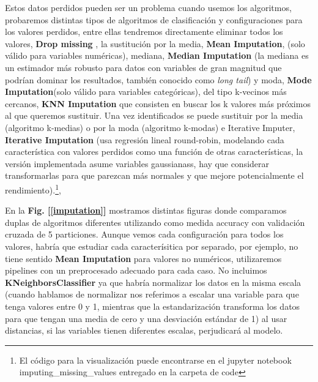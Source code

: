 \documentclass[12pt,twoside]{report}
\begin{document}
Estos datos perdidos pueden ser un problema cuando usemos los algoritmos, probaremos distintas tipos de algoritmos de clasificación y configuraciones para los valores perdidos, entre ellas tendremos directamente eliminar todos los valores, \textbf{Drop missing} , la sustitución por la media, \textbf{Mean Imputation}, (solo válido para variables numéricas), mediana, \textbf{Median Imputation} (la mediana es un estimador más robusto para datos con variables de gran magnitud que podrían dominar los resultados, también conocido como \textit{long tail}) y moda, \textbf{Mode Imputation}(solo válido para variables categóricas), del tipo k-vecinos más cercanos, \textbf{KNN Imputation} que consisten en buscar los k valores más próximos al que queremos sustituir. Una vez identificados se puede sustituir por la media (algoritmo k-medias) o por la moda (algoritmo k-modas) e Iterative Imputer, \textbf{Iterative Imputation} (usa regresión lineal round-robin, modelando cada característica con valores perdidos como una función de otras características, la versión implementada asume variables gaussianass, hay que considerar transformarlas para que parezcan más normales y que mejore potencialmente el rendimiento).\footnote{El código para la visualización puede encontrarse en el jupyter notebook imputing\_missing\_values entregado en la carpeta de code},



En la \textbf{Fig. [\ref{imputation}]} mostramos distintas figuras donde comparamos duplas de algoritmos diferentes utilizando como medida accuracy con validación cruzada de 5 particiones. Aunque vemos cada configuración para todos los valores, habría que estudiar cada caracterísitica por separado, por ejemplo, no tiene sentido \textbf{Mean Imputation} para valores no numéricos, utilizaremos pipelines con un preprocesado adecuado para cada caso. No incluimos \textbf{KNeighborsClassifier} ya que habría normalizar los datos en la misma escala (cuando hablamos de normalizar nos referimos a escalar una variable para que tenga valores entre 0 y 1, mientras que la estandarización transforma los datos para que tengan una media de cero y una desviación estándar de 1) al usar distancias, si las variables tienen diferentes escalas, perjudicará al modelo.
\end{document}
